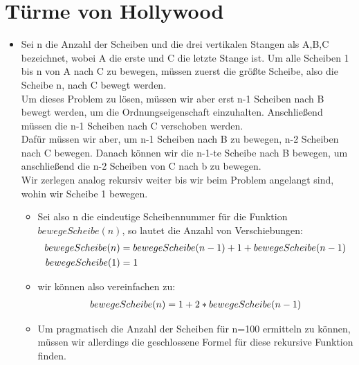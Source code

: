 \section{Türme von Hollywood}
 \begin{itemize}{a)}
 		\item 
 		Sei n die Anzahl der Scheiben und die drei vertikalen Stangen als A,B,C bezeichnet, wobei A die erste und C die letzte Stange ist. Um alle Scheiben 1 bis n von A nach C zu bewegen, müssen zuerst die größte Scheibe, also die Scheibe n, nach C bewegt werden. \\ Um dieses Problem zu lösen, müssen wir aber erst n-1 Scheiben nach B bewegt werden, um die Ordnungseigenschaft einzuhalten. Anschließend müssen die n-1 Scheiben nach C verschoben werden. \\
 		Dafür müssen wir aber, um n-1 Scheiben nach B zu bewegen, n-2 Scheiben nach C bewegen. Danach können wir die n-1-te Scheibe nach B bewegen, um anschließend die n-2 Scheiben von C nach b zu bewegen. \\
 		Wir zerlegen analog rekursiv weiter bis wir beim Problem angelangt sind, wohin wir Scheibe 1 bewegen. 
 		\begin{itemize}
 			\item Sei also n die eindeutige Scheibennummer für die Funktion $bewegeScheibe(n)$, so lautet die Anzahl von Verschiebungen: 
 			\begin{equation}
 				\begin{aligned}
 					bewegeScheibe(n) &= bewegeScheibe(n-1) + 1 + bewegeScheibe(n-1)\\
 					bewegeScheibe(1) &= 1 \notag\\
 				\end{aligned}
 			\end{equation}
 			\item wir können also vereinfachen zu: \\
 				\begin{equation}
 					\begin{aligned}
 						bewegeScheibe(n)= 1+ 2*bewegeScheibe(n-1) \notag\\
 					\end{aligned}
 				\end{equation}
 			\item Um pragmatisch die Anzahl der Scheiben für n=100 ermitteln zu können, müssen wir allerdings die geschlossene Formel für diese rekursive Funktion finden. 
 			

\end{itemize}
\end{itemize}
